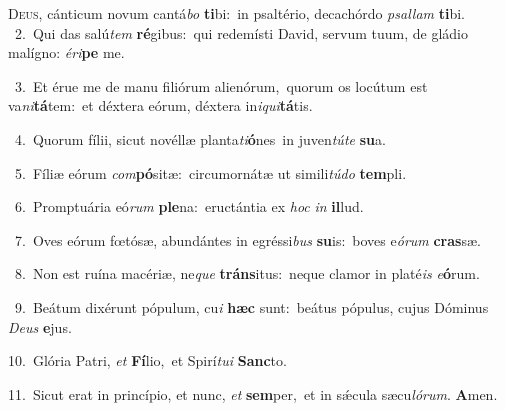 \lettrine{\initial\textcolor{\initialcolor}{D}}{eus,} cánticum novum cantá\textit{bo} \textbf{ti}\-bi:~\star in psaltério, decachórdo \textit{psal}\-\textit{lam} \textbf{ti}\-bi.\\
{\numbfont\textcolor{\numbcolor}{~2.}}~Qui das salú\textit{tem} \textbf{ré}\-gibus:~\star qui redemísti David, servum tuum, de gládio malígno: \textit{é}\-\textit{ri}\textbf{pe} me.\par
{\numbfont\textcolor{\numbcolor}{~3.}}~Et érue me de manu filiórum alienórum,~\dagger quorum os locútum est va\-\textit{ni}\-\textbf{tá}tem:~\star et déxtera eórum, déxtera in\-\textit{i}\-\textit{qui}\textbf{tá}tis.\par
{\numbfont\textcolor{\numbcolor}{~4.}}~Quorum fílii, sicut novéllæ planta\-\textit{ti}\-\textbf{ó}nes~\star in juven\-\textit{tú}\-\textit{te} \textbf{su}\-a.\par
{\numbfont\textcolor{\numbcolor}{~5.}}~Fíliæ eórum \textit{com}\-\textbf{pó}sitæ:~\star circumornátæ ut simili\-\textit{tú}\-\textit{do} \textbf{tem}\-pli.\par
{\numbfont\textcolor{\numbcolor}{~6.}}~Promptuária eó\textit{rum} \textbf{ple}\-na:~\star eructántia ex \textit{hoc} \textit{in} \textbf{il}\-lud.\par
{\numbfont\textcolor{\numbcolor}{~7.}}~Oves eórum fœtósæ, abundántes in egréssi\textit{bus} \textbf{su}\-is:~\star boves e\-\textit{ó}\-\textit{rum} \textbf{cras}\-sæ.\par
{\numbfont\textcolor{\numbcolor}{~8.}}~Non est ruína macériæ, ne\textit{que} \textbf{tráns}\-itus:~\star neque clamor in platé\textit{is} \textit{e}\-\textbf{ó}rum.\par
{\numbfont\textcolor{\numbcolor}{~9.}}~Beátum dixérunt pópulum, cu\textit{i} \textbf{hæc} sunt:~\star beátus pópulus, cujus Dóminus \textit{De}\-\textit{us} \textbf{e}\-jus.\par
{\numbfont\textcolor{\numbcolor}{10.}}~Glória Patri, \textit{et} \textbf{Fí}\-lio,~\star et Spirí\-\textit{tu}\-\textit{i} \textbf{Sanc}\-to.\par
{\numbfont\textcolor{\numbcolor}{11.}}~Sicut erat in princípio, et nunc, \textit{et} \textbf{sem}\-per,~\star et in sǽcula sæcu\-\textit{ló}\-\textit{rum}. \textbf{A}\-men.\par
